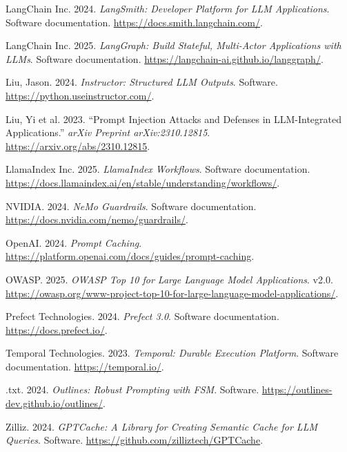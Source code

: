 \documentclass[
]{article}
\newlength{\cslhangindent}
\newenvironment{CSLReferences}[2] %
 {\begin{list}{}{%
  \setlength{\itemindent}{0pt}
  \setlength{\leftmargin}{0pt}
  \setlength{\parsep}{0pt}
  \ifodd #1
   \setlength{\leftmargin}{\cslhangindent}
   \setlength{\itemindent}{-1\cslhangindent}
  \fi
  \setlength{\itemsep}{#2\baselineskip}}}
 {\end{list}}
\begin{document}
\begin{CSLReferences}{1}{1}
LangChain Inc. 2024. \emph{{LangSmith}: Developer Platform for {LLM}
Applications}. Software documentation.
\url{https://docs.smith.langchain.com/}.

LangChain Inc. 2025. \emph{{LangGraph}: Build Stateful, Multi-Actor
Applications with {LLM}s}. Software documentation.
\url{https://langchain-ai.github.io/langgraph/}.

Liu, Jason. 2024. \emph{Instructor: Structured {LLM} Outputs}. Software.
\url{https://python.useinstructor.com/}.

{Liu, Yi et al.} 2023. {``Prompt Injection Attacks and Defenses in
{LLM}-Integrated Applications.''} \emph{arXiv Preprint
arXiv:2310.12815}. \url{https://arxiv.org/abs/2310.12815}.

LlamaIndex Inc. 2025. \emph{{LlamaIndex} Workflows}. Software
documentation.
\url{https://docs.llamaindex.ai/en/stable/understanding/workflows/}.

NVIDIA. 2024. \emph{{NeMo} Guardrails}. Software documentation.
\url{https://docs.nvidia.com/nemo/guardrails/}.

OpenAI. 2024. \emph{Prompt Caching}.
\url{https://platform.openai.com/docs/guides/prompt-caching}.

OWASP. 2025. \emph{{OWASP} {Top} 10 for {Large} {Language} {Model}
{Applications}}. v2.0.
\url{https://owasp.org/www-project-top-10-for-large-language-model-applications/}.

Prefect Technologies. 2024. \emph{Prefect 3.0}. Software documentation.
\url{https://docs.prefect.io/}.

Temporal Technologies. 2023. \emph{{Temporal}: Durable Execution
Platform}. Software documentation. \url{https://temporal.io/}.

{.txt}. 2024. \emph{Outlines: Robust Prompting with {FSM}}. Software.
\url{https://outlines-dev.github.io/outlines/}.

Zilliz. 2024. \emph{{GPTCache}: A Library for Creating Semantic Cache
for {LLM} Queries}. Software.
\url{https://github.com/zilliztech/GPTCache}.

\end{CSLReferences}
\end{document}
